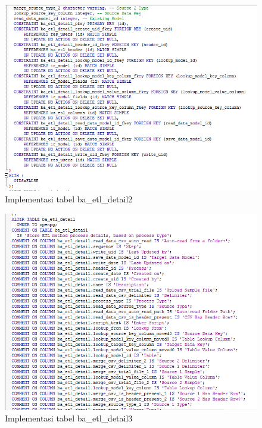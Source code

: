 \begin{itemize}
	\begin{figure}[H]
	\centering
	\includegraphics[scale=0.5]{Gambar/tabel-ba-etl-detail2}
	\caption{Implementasi tabel ba\_etl\_detail2}
	\end{figure}

\begin{figure}[H]
	\centering
	\includegraphics[scale=0.5]{Gambar/tabel-ba-etl-detail3}
	\caption{Implementasi tabel ba\_etl\_detail3}
	\end{figure}


\end{itemize}
